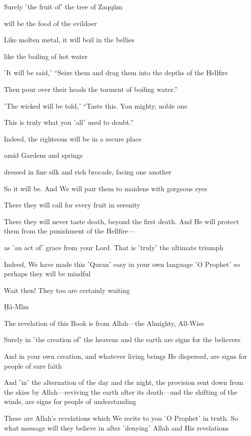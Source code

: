 Surely ˹the fruit of˺ the tree of Zaqqûm

will be the food of the evildoer

Like molten metal, it will boil in the bellies

like the boiling of hot water

˹It will be said,˺ “Seize them and drag them into the depths of the Hellfire

Then pour over their heads the torment of boiling water.”

˹The wicked will be told,˺ “Taste this. You mighty, noble one

This is truly what you ˹all˺ used to doubt.”

Indeed, the righteous will be in a secure place

amid Gardens and springs

dressed in fine silk and rich brocade, facing one another

So it will be. And We will pair them to maidens with gorgeous eyes

There they will call for every fruit in serenity

There they will never taste death, beyond the first death. And He will protect them from the punishment of the Hellfire—

as ˹an act of˺ grace from your Lord. That is ˹truly˺ the ultimate triumph

Indeed, We have made this ˹Quran˺ easy in your own language ˹O Prophet˺ so perhaps they will be mindful

Wait then! They too are certainly waiting

Ḥâ-Mĩm

The revelation of this Book is from Allah—the Almighty, All-Wise

Surely in ˹the creation of˺ the heavens and the earth are signs for the believers

And in your own creation, and whatever living beings He dispersed, are signs for people of sure faith

And ˹in˺ the alternation of the day and the night, the provision sent down from the skies by Allah—reviving the earth after its death—and the shifting of the winds, are signs for people of understanding

These are Allah’s revelations which We recite to you ˹O Prophet˺ in truth. So what message will they believe in after ˹denying˺ Allah and His revelations

